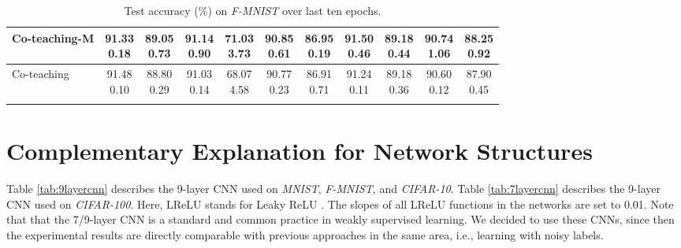 \documentclass[11pt]{article}
\begin{document}
\begin{table}[!htbp]
\begin{tabular}{l |cc|cc|cc|cc|cc}
			Co-teaching-M & \makecell{91.33\\ \scriptsize{0.18}}&\makecell{89.05\\ \scriptsize{0.73}} & \makecell{91.14\\ \scriptsize{0.90}}&\makecell{71.03\\ \scriptsize{3.73}}&\makecell{90.85\\ \scriptsize{0.61}}&\makecell{86.95\\ \scriptsize{0.19}}&\makecell{91.50\\ \scriptsize{0.46}}&\makecell{89.18\\ \scriptsize{0.44}}&\makecell{90.74\\ \scriptsize{1.06}}&\makecell{88.25\\ \scriptsize{0.92}}\\
			\hline 
			Co-teaching & \makecell{91.48\\ \scriptsize{0.10}}
			& \makecell{88.80\\ \scriptsize{0.29}}
			& \makecell{91.03\\ \scriptsize{0.14}}
			& \makecell{68.07\\ \scriptsize{4.58}}
			& \makecell{90.77\\ \scriptsize{0.23}}
			& \makecell{86.91\\ \scriptsize{0.71}}
			& \makecell{91.24\\ \scriptsize{0.11}}
			& \makecell{89.18\\ \scriptsize{0.36}}
            & \makecell{90.60\\ \scriptsize{0.12}}
			& \makecell{87.90\\ \scriptsize{0.45}}\\
		\Xhline{3\arrayrulewidth}
\end{tabular}
\caption
		{
Test accuracy (\%) on \textit{F-MNIST} over last ten epochs.
		}
	\label{tab:ablation_fmnist}
\end{table}		

\section{Complementary Explanation for Network Structures}
Table \ref{tab:9layercnn} describes the 9-layer CNN \cite{han2018co} used on \textit{MNIST}, \textit{F-MNIST}, and \textit{CIFAR-10}. Table \ref{tab:7layercnn} describes the 9-layer CNN \cite{yu2019does} used on \textit{CIFAR-100}. Here, LReLU stands for Leaky ReLU \cite{xu2015empirical}. The slopes of
all LReLU functions in the networks are set to 0.01. Note that that the 7/9-layer CNN is a standard and common practice in weakly supervised learning. We decided to use these CNNs, since then the experimental results are directly comparable with previous approaches in the same area, i.e., learning with noisy labels.
\end{document}
